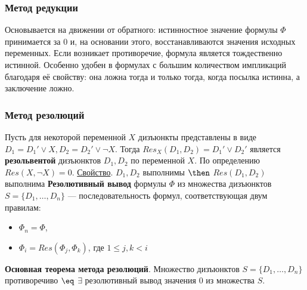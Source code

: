 \subsubsection{Метод редукции}
Основывается на движении от обратного: истинностное значение формулы $\Phi$ принимается за 0 и, на основании этого, восстанавливаются значения исходных переменных. Если возникает противоречие, формула является тождественно истинной. Особенно удобен в формулах с большим количеством импликаций благодаря её свойству: она ложна тогда и только тогда, когда посылка истинна, а заключение ложно.

\subsubsection{Метод резолюций}
\dftion Пусть для некоторой переменной $X$ дизъюнкты представлены в виде $D_1 = D_1' \lor X, D_2 = D_2' \lor \lnot X$. Тогда $Res_X(D_1, D_2) = D_1' \lor D_2'$ является \textbf{резольвентой} дизъюнктов $D_1, D_2$ по переменной $X$. По определению $Res(X, \lnot X) = 0$.
\underline{Свойство}. $D_1, D_2$ выполнимы $\then$ $Res(D_1, D_2)$ выполнима
\dftion \textbf{Резолютивный вывод} формулы $\Phi$ из множества дизъюнктов $S = \{D_1, \dots, D_n\}$ --- последовательность формул, соответствующая двум правилам:
\begin{itemize}
    \item $\Phi_n = \Phi$,
    \item $\Phi_i = Res(\Phi_j, \Phi_k)$, где $1 \leq j, k < i$
\end{itemize}
\textbf{Основная теорема метода резолюций}. Множество дизъюнктов $S = \{D_1, \dots, D_n\}$ противоречиво $\eq$ $\exists$ резолютивный вывод значения 0 из множества $S$.